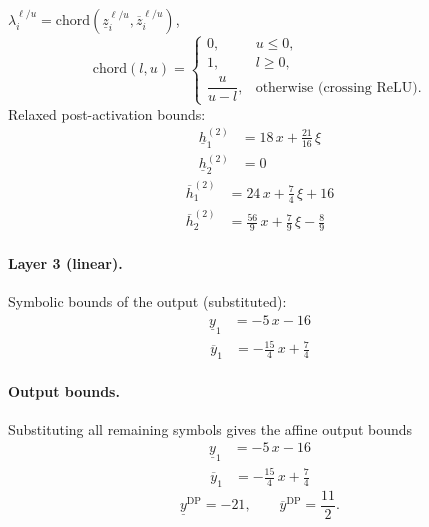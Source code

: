 \documentclass[11pt]{article}
\begin{document}
$\lambda^{\ell/u}_i = \mathrm{chord}(\underline{z}_i^{\ell/u}, \overline{z}_i^{\ell/u})$,
\[
\mathrm{chord}(l, u) =
\begin{cases}
0, & u \le 0,\\
1, & l \ge 0,\\
\dfrac{u}{u - l}, & \text{otherwise (crossing ReLU)}.
\end{cases}\]
Relaxed post-activation bounds:
\begin{align*}
\underline{h}^{(2)}_{1} &= 18\,x + \frac{21}{16}\,\xi \\
\underline{h}^{(2)}_{2} &= 0
\end{align*}
\begin{align*}
\overline{h}^{(2)}_{1} &= 24\,x + \frac{7}{4}\,\xi + 16 \\
\overline{h}^{(2)}_{2} &= \frac{56}{9}\,x + \frac{7}{9}\,\xi - \frac{8}{9}
\end{align*}
\paragraph{Layer 3 (linear).}
Symbolic bounds of the output (substituted):
\begin{align*}
\underline{y}_{1} &= -5\,x - 16
\end{align*}
\begin{align*}
\overline{y}_{1} &= -\frac{15}{4}\,x + \frac{7}{4}
\end{align*}
\paragraph{Output bounds.}
Substituting all remaining symbols gives the affine output bounds
\begin{align*}
\underline{y}_{1} &= -5\,x - 16
\end{align*}
\begin{align*}
\overline{y}_{1} &= -\frac{15}{4}\,x + \frac{7}{4}
\end{align*}
\begin{equation*}
\underline{y}^{\text{DP}} = -21, \qquad \overline{y}^{\text{DP}} = \frac{11}{2}.
\end{equation*}
\end{document}

